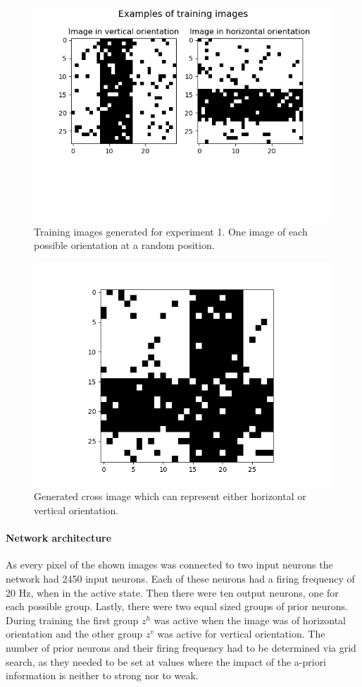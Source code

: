 \begin{figure}
  \includegraphics[width=\linewidth]{figures/horvert/horvertTrainingImages.png}
  \caption{Training images generated for experiment 1. One image of each possible orientation at a random position.}
  \label{fig:horvertImages}
\end{figure}

\begin{figure}
\centering
  \includegraphics[width=0.6\linewidth]{figures/horvert/horvertTrainingCrossImage.png}
  \caption{Generated cross image which can represent either horizontal or vertical orientation.}
  \label{fig:horvertTrainingCrossImage}
\end{figure}

\paragraph{Network architecture}

As every pixel of the shown images was connected to two input neurons the network had 2450 input neurons. Each of these neurons had a firing frequency of 20 Hz, when in the active state. Then there were ten output neurons, one for each possible group. Lastly, there were two equal sized groups of prior neurons. During training the first group $z^h$ was active when the image was of horizontal orientation and the other group $z^v$ was active for vertical orientation. The number of prior neurons and their firing frequency had to be determined via grid search, as they needed to be set at values where the impact of the a-priori information is neither to strong nor to weak.

